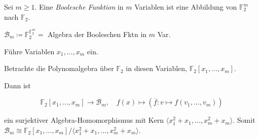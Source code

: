 \documentclass{cheat-sheet}
\newcommand{\F}{\mathbb{F}} %
\begin{document}


\begin{defn}
  Sei $m \geq 1$.
  Eine \emph{Boolesche Funktion} in $m$ Variablen ist eine Abbildung von $\F_2^m$ nach $\F_2$.
\end{defn}

\begin{nota}
  $\mathcal{B}_m \coloneqq \F_2^{\F_2^m} = $ Algebra der Booleschen Fktn in $m$ Var.
\end{nota}

Führe Variablen $x_1, \ldots, x_m$ ein.

Betrachte die Polynomalgebra über $\F_2$ in diesen Variablen, $\F_2[x_1, \ldots, x_m]$.

Dann ist

\[
  \F_2[x_1, \ldots, x_m] \to \mathcal{B}_m, \quad
  f(x) \mapsto (\overline{f} : v \mapsto f(v_1, \ldots, v_m))
\]

ein surjektiver Algebra-Homomorphismus mit Kern $\langle x_1^2 + x_1, \ldots, x_m^2 + x_m \rangle$.
Somit
$\mathcal{B}_m \cong \F_2[x_1, \ldots, x_m] / \langle x_1^2 + x_1, \ldots, x_m^2 + x_m \rangle$.
\end{document}
